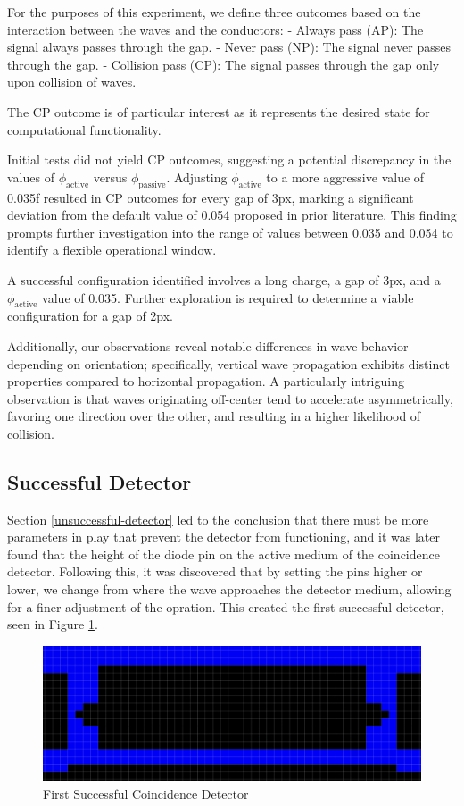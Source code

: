 For the purposes of this experiment, we define three outcomes based on the interaction between the waves and the conductors:
- Always pass (AP): The signal always passes through the gap.
- Never pass (NP): The signal never passes through the gap.
- Collision pass (CP): The signal passes through the gap only upon collision of waves.

The CP outcome is of particular interest as it represents the desired state for computational functionality.

Initial tests did not yield CP outcomes, suggesting a potential discrepancy in the values of $\phi_{\text{active}}$ versus $\phi_{\text{passive}}$. Adjusting $\phi_{\text{active}}$ to a more aggressive value of 0.035f resulted in CP outcomes for every gap of 3px, marking a significant deviation from the default value of 0.054 proposed in prior literature. This finding prompts further investigation into the range of values between 0.035 and 0.054 to identify a flexible operational window. 

A successful configuration identified involves a long charge, a gap of 3px, and a $\phi_{\text{active}}$ value of 0.035. Further exploration is required to determine a viable configuration for a gap of 2px.

Additionally, our observations reveal notable differences in wave behavior depending on orientation; specifically, vertical wave propagation exhibits distinct properties compared to horizontal propagation. A particularly intriguing observation is that waves originating off-center tend to accelerate asymmetrically, favoring one direction over the other, and resulting in a higher likelihood of collision.

\subsection{Successful Detector}

Section \ref{unsuccessful-detector} led to the conclusion that there must be more parameters in play that prevent the detector from functioning, and it was later found that the height of the diode pin on the active medium of the coincidence detector. 
Following this, it was discovered that by setting the pins higher or lower, we change from where the wave approaches the detector medium, allowing for a finer adjustment of the opration. This created the first successful detector, seen in Figure \ref{fig:first-successful-detector}.

\begin{figure}
    \centering
    \includegraphics[width=0.75\linewidth]{image9.png}
    \caption{First Successful Coincidence Detector}
    \label{fig:first-successful-detector}
\end{figure}


